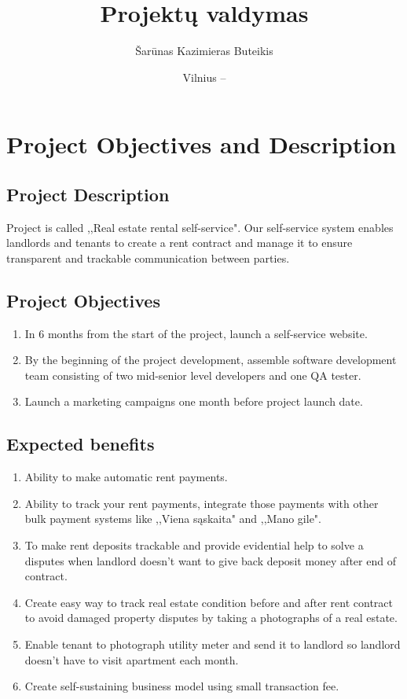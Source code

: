 \documentclass{VUMIFPSkursinis}
\title{Projektų valdymas}
\author{Šarūnas Kazimieras Buteikis}
\date{Vilnius – \the\year}
\begin{document}
\maketitle

\tableofcontents

\section{Project Objectives and Description}
	\subsection{Project Description}
		Project is called ,,Real estate rental self-service". 
		Our self-service system enables landlords and tenants to create a rent contract and manage it to ensure transparent and trackable communication between parties.

	\subsection{Project Objectives}
		\begin{enumerate}
			\item{In 6 months from the start of the project, launch a self-service website.}
			\item{By the beginning of the project development, assemble software development team consisting of two mid-senior level developers and one QA tester.}
			\item{Launch a marketing campaigns one month before project launch date.}
		\end{enumerate}

	\subsection{Expected benefits}
		\begin{enumerate}
			\item{Ability to make automatic rent payments.}
			\item{Ability to track your rent payments, integrate those payments with other bulk payment systems like ,,Viena sąskaita" and ,,Mano gile".}
			\item{To make rent deposits trackable and provide evidential help to solve a disputes when landlord doesn't want to give back deposit money after end of contract.}
			\item{Create easy way to track real estate condition before and after rent contract to avoid damaged property disputes by taking a photographs of a real estate.}
			\item{Enable tenant to photograph utility meter and send it to landlord so landlord doesn't have to visit apartment each month.}
			\item{Create self-sustaining business model using small transaction fee.}
		\end{enumerate}
\end{document}
